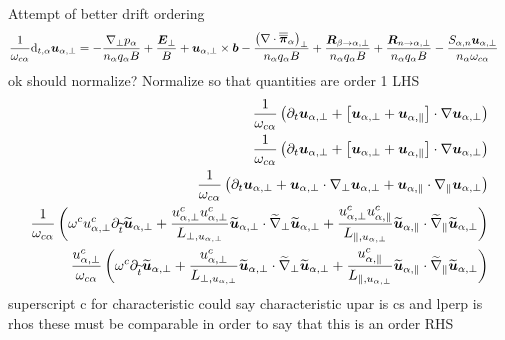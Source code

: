 Attempt of better drift ordering
%
\begin{align}
 \frac{1}{\omega_{c\alpha}}\text{d}_{t,\alpha} \boldsymbol{u}_{\alpha,\perp}
 &=
 -
 \frac{
   \nabla_\perp p_\alpha
 }{n_\alpha  q_\alpha B}
 +
 \frac{\boldsymbol{E}_\perp}{B}
 +
 \boldsymbol{u}_{\alpha,\perp}\times\boldsymbol{b}
 -
  \frac{
   \left(\nabla\cdot\boldsymbol{\overline{\overline{\pi}}}_\alpha\right)_\perp
 }{n_\alpha  q_\alpha B}
 +
 \frac{
   \boldsymbol{R}_{\beta \to \alpha,\perp}
 }{n_\alpha q_\alpha B}
 +
 \frac{
   \boldsymbol{R}_{n \to \alpha,\perp}
 }{n_\alpha q_\alpha B}
 -
 \frac{
     S_{\alpha,n}\boldsymbol{u}_{\alpha,\perp}
 }{n_\alpha \omega_{c\alpha}}
\end{align}
%
ok
should normalize?
Normalize so that quantities are order 1
LHS
%
\begin{align}
 \frac{1}{\omega_{c\alpha}}
 \left(
 \partial_t \boldsymbol{u}_{\alpha,\perp}
 + \left[\boldsymbol{u}_{\alpha,\perp}
 + \boldsymbol{u}_{\alpha,\|}\right]\cdot\nabla\boldsymbol{u}_{\alpha,\perp}
 \right)
 \\
 \frac{1}{\omega_{c\alpha}}
 \left(
 \partial_t \boldsymbol{u}_{\alpha,\perp}
 + \left[\boldsymbol{u}_{\alpha,\perp}
 + \boldsymbol{u}_{\alpha,\|}\right]\cdot\nabla\boldsymbol{u}_{\alpha,\perp}
 \right)
 \\
 \frac{1}{\omega_{c\alpha}}
 \left(
 \partial_t \boldsymbol{u}_{\alpha,\perp}
 + \boldsymbol{u}_{\alpha,\perp}\cdot\nabla_\perp\boldsymbol{u}_{\alpha,\perp}
 + \boldsymbol{u}_{\alpha,\|}\cdot\nabla_\|\boldsymbol{u}_{\alpha,\perp}
 \right)
 \\
 \frac{1}{\omega_{c\alpha}}
 \left(
 \omega^cu^c_{\alpha,\perp}
 \partial_{\widetilde{ t}} \widetilde{ \boldsymbol{u}}_{\alpha,\perp}
 + \frac{u_{\alpha,\perp}^{c}u_{\alpha,\perp}^{c}}{L_{\perp, u_{\alpha,\perp}}}
 \widetilde{ \boldsymbol{u}}_{\alpha,\perp}\cdot\widetilde{ \nabla}_\perp\widetilde{ \boldsymbol{u}}_{\alpha,\perp}
 + \frac{u^c_{\alpha,\perp}u^c_{\alpha,\|}}{L_{\|, u_{\alpha,\perp}}}
 \widetilde{ \boldsymbol{u}}_{\alpha,\|}\cdot\widetilde{ \nabla}_\|\widetilde{ \boldsymbol{u}}_{\alpha,\perp}
 \right)
 \\
 \frac{u^c_{\alpha,\perp}}{\omega_{c\alpha}}
 \left(
 \omega^c
 \partial_{\widetilde{ t}} \widetilde{ \boldsymbol{u}}_{\alpha,\perp}
 + \frac{u^c_{\alpha,\perp}}{L_{\perp, u_{\alpha,\perp}}}
 \widetilde{ \boldsymbol{u}}_{\alpha,\perp}\cdot\widetilde{ \nabla}_\perp\widetilde{ \boldsymbol{u}}_{\alpha,\perp}
 + \frac{u^c_{\alpha,\|}}{L_{\|, u_{\alpha,\perp}}}
 \widetilde{ \boldsymbol{u}}_{\alpha,\|}\cdot\widetilde{ \nabla}_\|\widetilde{ \boldsymbol{u}}_{\alpha,\perp}
 \right)
\end{align}
%
superscript c for characteristic
could say characteristic upar is cs and lperp is rhos
these must be comparable in order to say that this is an order
RHS
%
